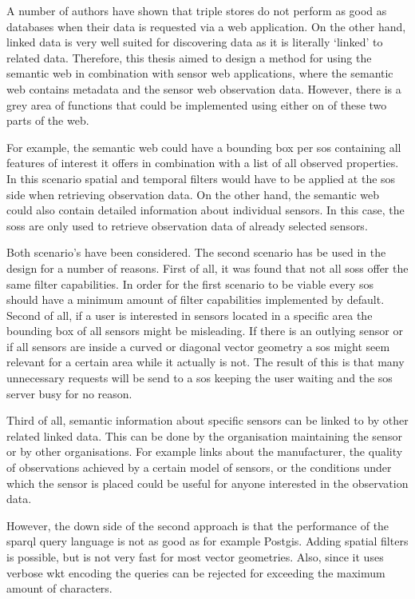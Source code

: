 A number of authors have shown that triple stores do not perform as good as databases when their data is requested via a web application. On the other hand, linked data is very well suited for discovering data as it is literally `linked' to related data. Therefore, this thesis aimed to design a method for using the semantic web in combination with sensor web applications, where the semantic web contains metadata and the sensor web observation data. However, there is a grey area of functions that could be implemented using either on of these two parts of the web. 

For example, the semantic web could have a bounding box per \ac{sos} containing all features of interest it offers in combination with a list of all observed properties. In this scenario spatial and temporal filters would have to be applied at the \ac{sos} side when retrieving observation data. On the other hand, the semantic web could also contain detailed information about individual sensors. In this case, the \aclp{sos} are only used to retrieve observation data of already selected sensors.

Both scenario's have been considered. The second scenario has be used in the design for a number of reasons. First of all, it was found that not all \aclp{sos} offer the same filter capabilities. In order for the first scenario to be viable every \ac{sos} should have a minimum amount of filter capabilities implemented by default. 
Second of all, if a user is interested in sensors located in a specific area the bounding box of all sensors might be misleading. If there is an outlying sensor or if all sensors are inside a curved or diagonal vector geometry a \ac{sos} might seem relevant for a certain area while it actually is not. The result of this is that many unnecessary requests will be send to a \ac{sos} keeping the user waiting and the \ac{sos} server busy for no reason. 

Third of all, semantic information about specific sensors can be linked to by other related linked data. This can be done by the organisation maintaining the sensor or by other organisations. For example links about the manufacturer, the quality of observations achieved by a certain model of sensors, or the conditions under which the sensor is placed could be useful for anyone interested in the observation data. 

However, the down side of the second approach is that the performance of the \ac{sparql} query language is not as good as for example Postgis. Adding spatial filters is possible, but is not very fast for most vector geometries. Also, since it uses verbose \ac{wkt} encoding the queries can be rejected for exceeding the maximum amount of characters.            


